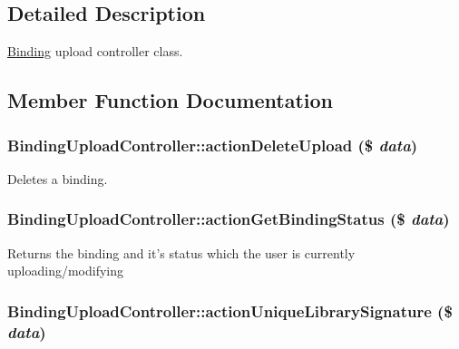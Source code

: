 \subsection{Detailed Description}
\hyperlink{classBinding}{Binding} upload controller class. 

\subsection{Member Function Documentation}
\hypertarget{classBindingUploadController_a352c9e62f7dfab9c1cec089fd783d3fb}{
\subsubsection[{actionDeleteUpload}]{\setlength{\rightskip}{0pt plus 5cm}BindingUploadController::actionDeleteUpload (\$ {\em data})}}
\label{classBindingUploadController_a352c9e62f7dfab9c1cec089fd783d3fb}
Deletes a binding. \hypertarget{classBindingUploadController_a2735f7ba9c4e31dd3a6c669b44f49b33}{
\subsubsection[{actionGetBindingStatus}]{\setlength{\rightskip}{0pt plus 5cm}BindingUploadController::actionGetBindingStatus (\$ {\em data})}}
\label{classBindingUploadController_a2735f7ba9c4e31dd3a6c669b44f49b33}
Returns the binding and it's status which the user is currently uploading/modifying \hypertarget{classBindingUploadController_aa72c03504674104e40038b35f22681fa}{
\subsubsection[{actionUniqueLibrarySignature}]{\setlength{\rightskip}{0pt plus 5cm}BindingUploadController::actionUniqueLibrarySignature (\$ {\em data})}}
\label{classBindingUploadController_aa72c03504674104e40038b35f22681fa}
